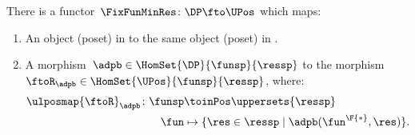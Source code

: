 \begin{lemma}
    \label{lem:covfunctor}
    There is a functor~$\FixFunMinRes\colon \DP \fto \UPos$ which maps:
    \begin{enumerate}
        \item An object (poset) in \DP to the same object (poset) in \UPos.
        \item A morphism~$\adpb\in \HomSet{\DP}{\funsp}{\ressp}$ to the morphism~$\ftoR_{\adpb}\in \HomSet{\UPos}{\funsp}{\ressp}$, where:
              \begin{equation}
                  \begin{aligned}
                      \ulposmap{\ftoR}_{\adpb}\colon \funsp & \toinPos \uppersets{\ressp}                             \\
                      \fun                                  & \mapsto \{\res \in \ressp\mid \adpb(\fun^\F{*},\res)\}.
                  \end{aligned}
              \end{equation}
    \end{enumerate}
\end{lemma}

